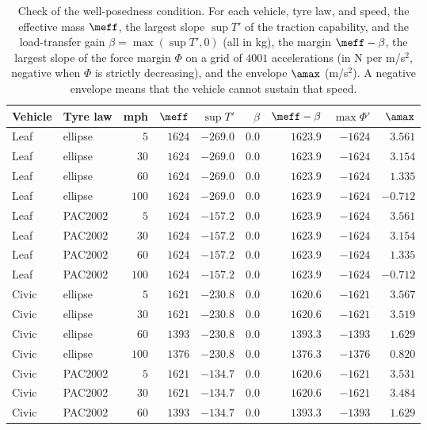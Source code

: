 \begin{table}[htbp]
\centering\small
\caption{Check of the well-posedness condition. For each vehicle, tyre law, and speed, the effective mass $\meff$, the largest slope $\sup T'$ of the traction capability, and the load-transfer gain $\beta=\max(\sup T',0)$ (all in kg), the margin $\meff-\beta$, the largest slope of the force margin $\Phi$ on a grid of $4001$ accelerations (in N per m/s$^2$, negative when $\Phi$ is strictly decreasing), and the envelope $\amax$ (m/s$^2$). A negative envelope means that the vehicle cannot sustain that speed.}\label{tab:app-wellposed}
\begin{tabular}{llrrrrrrr}
\toprule
Vehicle & Tyre law & mph & $\meff$ & $\sup T'$ & $\beta$ & $\meff-\beta$ & $\max\Phi'$ & $\amax$\\
\midrule
Leaf & ellipse & $5$ & $1624$ & $-269.0$ & $0.0$ & $1623.9$ & $-1624$ & $3.561$\\
Leaf & ellipse & $30$ & $1624$ & $-269.0$ & $0.0$ & $1623.9$ & $-1624$ & $3.154$\\
Leaf & ellipse & $60$ & $1624$ & $-269.0$ & $0.0$ & $1623.9$ & $-1624$ & $1.335$\\
Leaf & ellipse & $100$ & $1624$ & $-269.0$ & $0.0$ & $1623.9$ & $-1624$ & $-0.712$\\
Leaf & PAC2002 & $5$ & $1624$ & $-157.2$ & $0.0$ & $1623.9$ & $-1624$ & $3.561$\\
Leaf & PAC2002 & $30$ & $1624$ & $-157.2$ & $0.0$ & $1623.9$ & $-1624$ & $3.154$\\
Leaf & PAC2002 & $60$ & $1624$ & $-157.2$ & $0.0$ & $1623.9$ & $-1624$ & $1.335$\\
Leaf & PAC2002 & $100$ & $1624$ & $-157.2$ & $0.0$ & $1623.9$ & $-1624$ & $-0.712$\\
Civic & ellipse & $5$ & $1621$ & $-230.8$ & $0.0$ & $1620.6$ & $-1621$ & $3.567$\\
Civic & ellipse & $30$ & $1621$ & $-230.8$ & $0.0$ & $1620.6$ & $-1621$ & $3.519$\\
Civic & ellipse & $60$ & $1393$ & $-230.8$ & $0.0$ & $1393.3$ & $-1393$ & $1.629$\\
Civic & ellipse & $100$ & $1376$ & $-230.8$ & $0.0$ & $1376.3$ & $-1376$ & $0.820$\\
Civic & PAC2002 & $5$ & $1621$ & $-134.7$ & $0.0$ & $1620.6$ & $-1621$ & $3.531$\\
Civic & PAC2002 & $30$ & $1621$ & $-134.7$ & $0.0$ & $1620.6$ & $-1621$ & $3.484$\\
Civic & PAC2002 & $60$ & $1393$ & $-134.7$ & $0.0$ & $1393.3$ & $-1393$ & $1.629$\\

\end{tabular}
\end{table}
